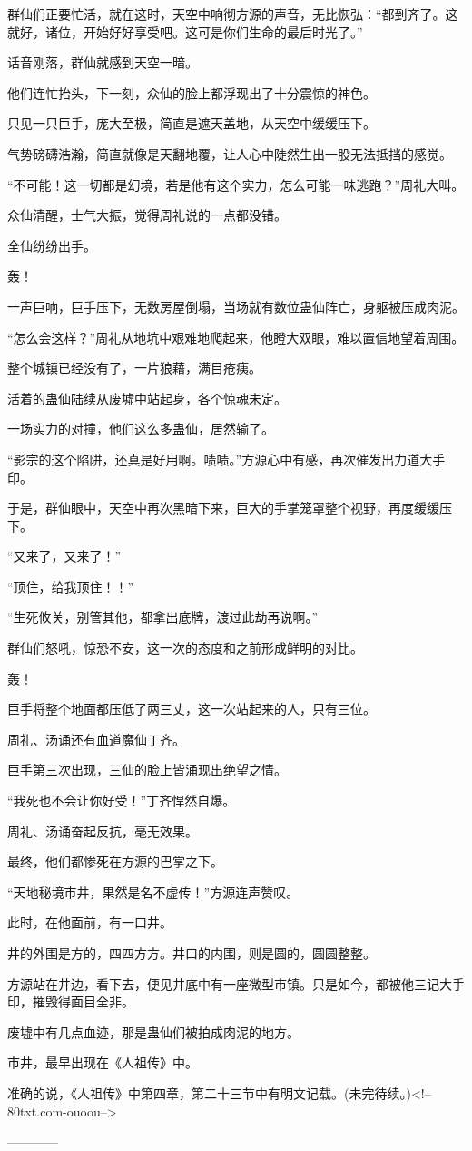 \begin{this_body}
群仙们正要忙活，就在这时，天空中响彻方源的声音，无比恢弘：“都到齐了。这就好，诸位，开始好好享受吧。这可是你们生命的最后时光了。”

话音刚落，群仙就感到天空一暗。

他们连忙抬头，下一刻，众仙的脸上都浮现出了十分震惊的神色。

只见一只巨手，庞大至极，简直是遮天盖地，从天空中缓缓压下。

气势磅礴浩瀚，简直就像是天翻地覆，让人心中陡然生出一股无法抵挡的感觉。

“不可能！这一切都是幻境，若是他有这个实力，怎么可能一味逃跑？”周礼大叫。

众仙清醒，士气大振，觉得周礼说的一点都没错。

全仙纷纷出手。

轰！

一声巨响，巨手压下，无数房屋倒塌，当场就有数位蛊仙阵亡，身躯被压成肉泥。

“怎么会这样？”周礼从地坑中艰难地爬起来，他瞪大双眼，难以置信地望着周围。

整个城镇已经没有了，一片狼藉，满目疮痍。

活着的蛊仙陆续从废墟中站起身，各个惊魂未定。

一场实力的对撞，他们这么多蛊仙，居然输了。

“影宗的这个陷阱，还真是好用啊。啧啧。”方源心中有感，再次催发出力道大手印。

于是，群仙眼中，天空中再次黑暗下来，巨大的手掌笼罩整个视野，再度缓缓压下。

“又来了，又来了！”

“顶住，给我顶住！！”

“生死攸关，别管其他，都拿出底牌，渡过此劫再说啊。”

群仙们怒吼，惊恐不安，这一次的态度和之前形成鲜明的对比。

轰！

巨手将整个地面都压低了两三丈，这一次站起来的人，只有三位。

周礼、汤诵还有血道魔仙丁齐。

巨手第三次出现，三仙的脸上皆涌现出绝望之情。

“我死也不会让你好受！”丁齐悍然自爆。

周礼、汤诵奋起反抗，毫无效果。

最终，他们都惨死在方源的巴掌之下。

“天地秘境市井，果然是名不虚传！”方源连声赞叹。

此时，在他面前，有一口井。

井的外围是方的，四四方方。井口的内围，则是圆的，圆圆整整。

方源站在井边，看下去，便见井底中有一座微型市镇。只是如今，都被他三记大手印，摧毁得面目全非。

废墟中有几点血迹，那是蛊仙们被拍成肉泥的地方。

市井，最早出现在《人祖传》中。

准确的说，《人祖传》中第四章，第二十三节中有明文记载。(未完待续。)<!--80txt.com-ouoou-->

------------

\end{this_body}

